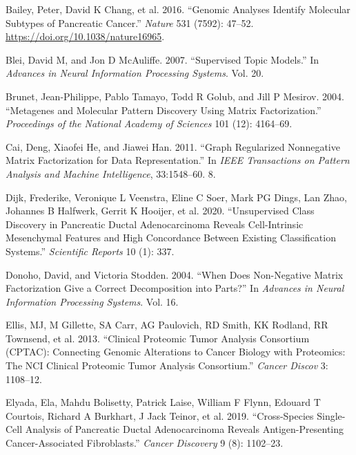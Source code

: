 \documentclass[
]{article}
\newlength{\cslhangindent}
\newenvironment{CSLReferences}[2] %
 {\begin{list}{}{%
  \setlength{\itemindent}{0pt}
  \setlength{\leftmargin}{0pt}
  \setlength{\parsep}{0pt}
  \ifodd #1
   \setlength{\leftmargin}{\cslhangindent}
   \setlength{\itemindent}{-1\cslhangindent}
  \fi
  \setlength{\itemsep}{#2\baselineskip}}}
 {\end{list}}
\begin{document}
\label{refs}
\begin{CSLReferences}{1}{0}
Bailey, Peter, David K Chang, et al. 2016. {``Genomic Analyses Identify
Molecular Subtypes of Pancreatic Cancer.''} \emph{Nature} 531 (7592):
47--52. \url{https://doi.org/10.1038/nature16965}.

Blei, David M, and Jon D McAuliffe. 2007. {``Supervised Topic Models.''}
In \emph{Advances in Neural Information Processing Systems}. Vol. 20.

Brunet, Jean-Philippe, Pablo Tamayo, Todd R Golub, and Jill P Mesirov.
2004. {``Metagenes and Molecular Pattern Discovery Using Matrix
Factorization.''} \emph{Proceedings of the National Academy of Sciences}
101 (12): 4164--69.

Cai, Deng, Xiaofei He, and Jiawei Han. 2011. {``Graph Regularized
Nonnegative Matrix Factorization for Data Representation.''} In
\emph{IEEE Transactions on Pattern Analysis and Machine Intelligence},
33:1548--60. 8.

Dijk, Frederike, Veronique L Veenstra, Eline C Soer, Mark PG Dings, Lan
Zhao, Johannes B Halfwerk, Gerrit K Hooijer, et al. 2020.
{``Unsupervised Class Discovery in Pancreatic Ductal Adenocarcinoma
Reveals Cell-Intrinsic Mesenchymal Features and High Concordance Between
Existing Classification Systems.''} \emph{Scientific Reports} 10 (1):
337.

Donoho, David, and Victoria Stodden. 2004. {``When Does Non-Negative
Matrix Factorization Give a Correct Decomposition into Parts?''} In
\emph{Advances in Neural Information Processing Systems}. Vol. 16.

Ellis, MJ, M Gillette, SA Carr, AG Paulovich, RD Smith, KK Rodland, RR
Townsend, et al. 2013. {``Clinical Proteomic Tumor Analysis Consortium
(CPTAC): Connecting Genomic Alterations to Cancer Biology with
Proteomics: The NCI Clinical Proteomic Tumor Analysis Consortium.''}
\emph{Cancer Discov} 3: 1108--12.

Elyada, Ela, Mahdu Bolisetty, Patrick Laise, William F Flynn, Edouard T
Courtois, Richard A Burkhart, J Jack Teinor, et al. 2019.
{``Cross-Species Single-Cell Analysis of Pancreatic Ductal
Adenocarcinoma Reveals Antigen-Presenting Cancer-Associated
Fibroblasts.''} \emph{Cancer Discovery} 9 (8): 1102--23.


\end{CSLReferences}
\end{document}
